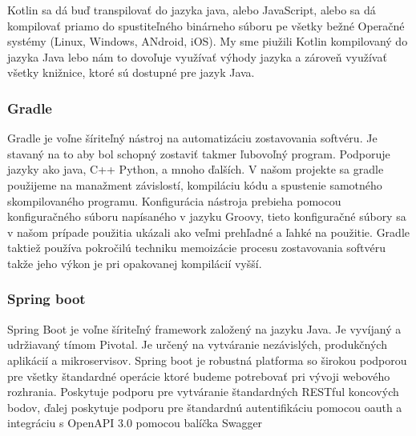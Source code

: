 Kotlin sa dá buď transpilovať do jazyka java, alebo JavaScript, alebo sa dá kompilovať priamo do spustiteľného  binárneho súboru pe všetky bežné Operačné systémy (Linux, Windows, ANdroid, iOS). 
My sme piužili Kotlin kompilovaný do jazyka Java lebo nám to dovoľuje využívať výhody jazyka a zároveň využívať všetky knižnice, ktoré sú dostupné pre jazyk Java. 

\subsubsection{Gradle}  
Gradle je voľne šíriteľný nástroj na automatizáciu zostavovania softvéru. Je stavaný na to aby bol schopný zostaviť takmer ľubovoľný program. Podporuje jazyky ako java, C++ Python, a mnoho ďalších. V našom projekte sa gradle použijeme na manažment závislostí, kompiláciu kódu a spustenie samotného skompilovaného programu. Konfigurácia nástroja prebieha pomocou konfiguračného súboru napísaného v jazyku Groovy, tieto konfiguračné  súbory sa v našom prípade použitia ukázali ako veľmi prehľadné a ľahké na použitie. Gradle taktiež používa pokročilú techniku memoizácie procesu zostavovania softvéru takže jeho výkon je pri opakovanej kompilácií vyšší. 


\subsubsection{Spring boot}  
Spring Boot je voľne šíriteľný framework založený na jazyku Java. Je vyvíjaný a udržiavaný tímom Pivotal. Je určený na vytváranie nezávislých, produkčných aplikácií a mikroservisov. Spring boot je robustná platforma so širokou podporou pre všetky štandardné operácie ktoré budeme potrebovať pri vývoji webového rozhrania. Poskytuje podporu pre vytváranie štandardných RESTful koncových bodov, ďalej poskytuje podporu pre štandardnú autentifikáciu pomocou \acrshort{oauth} a integráciu s  OpenAPI 3.0 \cite{openapi3} pomocou balíčka Swagger \cite{swagger} 






